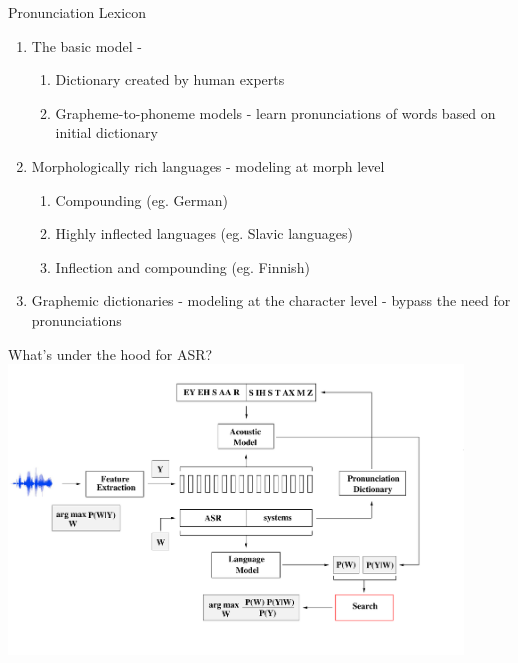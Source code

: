 \begin{frame}{Pronunciation Lexicon}
\begin{enumerate}
\item The \alert{basic} model -
\begin{enumerate}
\item Dictionary created by human experts
\item Grapheme-to-phoneme models - learn pronunciations of words based on initial dictionary
\end{enumerate}
\item \alert{Morphologically rich languages} - modeling at morph level
\begin{enumerate}
\item Compounding (eg. German)
\item Highly inflected languages (eg. Slavic languages)
\item Inflection and compounding (eg. Finnish)
\end{enumerate}
\item \alert{Graphemic dictionaries} - modeling at the character level - bypass the need for pronunciations
\end{enumerate}
\end{frame}

\begin{frame}{What's under the hood for ASR?}
\includegraphics[height=77mm]{figures/b5}
\end{frame}

